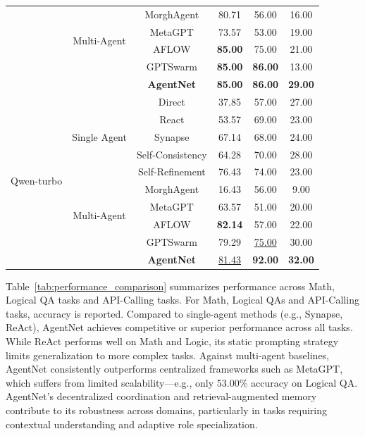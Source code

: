 \documentclass{article}
\begin{document}
\begin{table}[t]
{\begin{tabular}{@{}ccc|c|c|c@{}}
    & \multirow{4}{*}{Multi-Agent} 
    & MorghAgent & 80.71 & 56.00 & 16.00\\
    & & MetaGPT & 73.57 & 53.00 & 19.00\\
    & & AFLOW & \textbf{85.00} & 75.00 & 21.00\\
    & & GPTSwarm & \textbf{85.00} & \textbf{86.00} & 13.00\\
    \rowcolor{rowshade}
    
    & & \textbf{AgentNet} &\textbf{85.00} & \textbf{86.00} & \textbf{29.00}\\

    \midrule
    \multirow{10}{*}{Qwen-turbo} & \multirow{5}{*}{Single Agent} 
    & Direct & 37.85 & 57.00 & 27.00\\
    & & React & 53.57 & 69.00 & 23.00\\
    & & Synapse & 67.14 & 68.00 & 24.00\\
    & & Self-Consistency & 64.28 & 70.00 & 28.00\\
    & & Self-Refinement & 76.43 & 74.00 & 23.00\\
    \cmidrule(lr){2-6}
    
    & \multirow{4}{*}{Multi-Agent} 
    & MorghAgent & 16.43 & 56.00 & 9.00\\
    & & MetaGPT & 63.57 & 51.00 & 20.00\\
    & & AFLOW & \textbf{82.14} & 57.00  & 22.00\\
    & & GPTSwarm & 79.29 & \underline{75.00} & 30.00\\
    \rowcolor{rowshade}

    & & \textbf{AgentNet} & \underline{81.43} & \textbf{92.00} & \textbf{32.00}\\
    \midrule
    \bottomrule
  \end{tabular}
  }
  \vspace{-0.5cm}
\end{table}


Table~\ref{tab:performance_comparison} summarizes performance across Math, Logical QA tasks and API-Calling tasks. For Math, Logical QAs  and API-Calling tasks, accuracy is reported.
Compared to single-agent methods (e.g., Synapse, ReAct), AgentNet achieves competitive or superior performance across all tasks. While ReAct performs well on Math and Logic, its static prompting strategy limits generalization to more complex tasks.
Against multi-agent baselines, AgentNet consistently outperforms centralized frameworks such as MetaGPT, which suffers from limited scalability—e.g., only 53.00\% accuracy on Logical QA. 
AgentNet's decentralized coordination and retrieval-augmented memory contribute to its robustness across domains, particularly in tasks requiring contextual understanding and adaptive role specialization.
\end{document}
